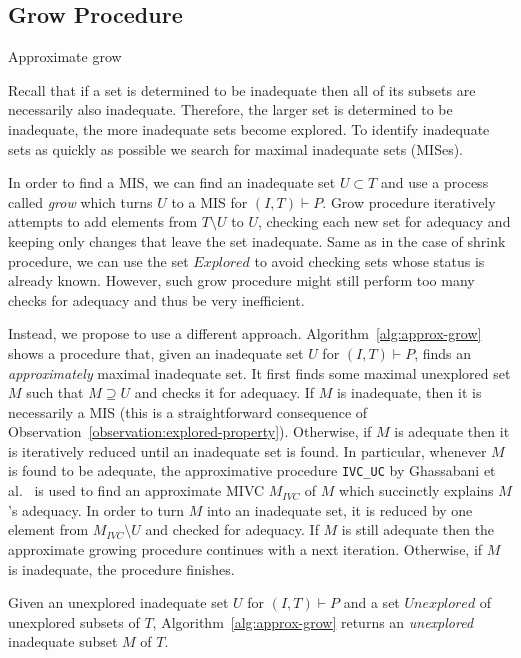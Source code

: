 \subsection{Grow Procedure}
\begin{algorithm}[!t]
\label{alg:approx-grow}

\caption{Approximate grow}
\end{algorithm}

Recall that if a set is determined to be inadequate then all of its subsets are necessarily also inadequate. Therefore, the larger set is determined to be inadequate, the more inadequate sets become explored.  %
To identify inadequate sets as quickly as possible we search for maximal inadequate sets (MISes).

In order to find a MIS, we can find an inadequate set $U \subset T$ and use a process called \emph{grow} which turns $U$ to a MIS for $(I,T) \vdash P$.
Grow procedure iteratively attempts to add elements from $T \setminus U$ to $U$, checking each new set for adequacy and keeping only changes that leave the set inadequate. Same as in the case of shrink procedure, we can use the set $Explored$ to avoid checking sets whose status is already known.
However, such grow procedure might still perform too many checks for adequacy and thus be very inefficient.


Instead, we propose to use a different approach. Algorithm~\ref{alg:approx-grow} shows a procedure that, given an inadequate set $U$ for $(I, T) \vdash P$, finds an \emph{approximately} maximal inadequate set.
It first finds some maximal unexplored set $M$ such that $M \supseteq U$ and checks it for adequacy.
If $M$ is inadequate, then it is necessarily a MIS
(this is a straightforward consequence of Observation~\ref{observation:explored-property}).
Otherwise, if $M$ is adequate then it is iteratively reduced until an inadequate set is found.
In particular, whenever $M$ is found to be adequate, the approximative procedure \texttt{IVC\_UC} by Ghassabani et al.~\cite{single-mivc} is used to find an approximate MIVC $M_{IVC}$ of $M$ which succinctly explains $M$'s adequacy. In order to turn $M$ into an inadequate set, it is reduced by one element from $M_{IVC} \setminus U$ and checked for adequacy. If $M$ is still adequate then the approximate growing procedure continues with a next iteration. Otherwise, if $M$ is inadequate, the procedure finishes.

\begin{proposition}
Given an unexplored inadequate set $U$ for $(I,T) \vdash P$ and a set $\mathit{Unexplored}$ of unexplored subsets of $T$, Algorithm~\ref{alg:approx-grow} returns an \emph{unexplored} inadequate subset $M$ of $T$.
\end{proposition}

